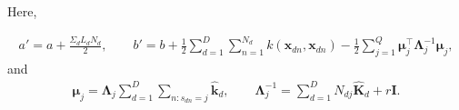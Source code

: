 \documentclass[]{article}
\newcommand{\kernel}[2]{k\left(#1,#2\right)}
\newcommand{\kernelwx}[1]{k\left(\mathbf{w}_{#1}^d,\indobj\right)}
\newcommand{\C}{\boldsymbol{\Lambda}_j}
\newcommand{\muJ}{\boldsymbol{\mu}_j}
\newcommand{\indobj}{\mathbf{x}_{dn}}
\newcommand{\projMat}{\boldsymbol{\mathcal{W}}_d}
\newcommand{\phixnd}{\boldsymbol{\phi}\left(\indobj\right)}
\newcommand{\phiwld}[1]{\boldsymbol{\varphi}\left(\mathbf{w}_{#1}^d\right)}
\newcommand{\phiwldI}[2]{\varphi_{#2}\left(\mathbf{w}_{#1}^d\right)}
\newcommand{\kawx}{\mathbf{\hat{k}}_d }
\newcommand{\Kaww}{\mathbf{\hat{K}}_d }
\begin{document}
Here,

\begin{align}
a'=a+{\frac{\Sigma_d L_d N_d}{2}}, \quad \quad b'=b+{\frac{1}{2}}\sum\limits_{d=1}^{D}\sum\limits_{n=1}^{N_d}\kernel{\indobj}{\indobj}-{\frac{1}{2}}\sum\limits_{j=1}^{Q}\boldsymbol{\mu}_j^\top \C^{-1}\muJ,
\end{align}
 and 
\begin{align}
\muJ =\C\sum\limits_{d=1}^{D}{\sum\limits_{n:s_{dn}=j}\kawx}, \quad \quad \C^{-1} =\sum\limits_{d=1}^{D}{N_{dj}\Kaww+r\mathbf{I}}.
\end{align}



%
%
%
\end{document}

